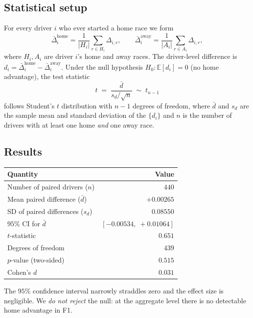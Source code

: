 \documentclass[11pt,a4paper]{article}
\newcommand{\E}{\mathbb{E}}
\begin{document}
\subsection{Statistical setup}
For every driver $i$ who ever started a home race we form
\begin{equation}
\bar{\Delta}_i^{\text{home}} = \frac{1}{|H_i|}\sum_{r\in H_i}\Delta_{i,r},
\qquad
\bar{\Delta}_i^{\text{away}} = \frac{1}{|A_i|}\sum_{r\in A_i}\Delta_{i,r},
\end{equation}
where $H_i,A_i$ are driver $i$'s home and away races. The driver-level
difference is $d_i = \bar{\Delta}_i^{\text{home}} - \bar{\Delta}_i^{\text{away}}$.
Under the null hypothesis $H_0:\E[d_i]=0$ (no home advantage), the test
statistic
\begin{equation}
    t \;=\; \frac{\bar{d}}{s_d/\sqrt{n}} \;\sim\; t_{n-1}
\end{equation}
follows Student's $t$ distribution with $n-1$ degrees of freedom, where
$\bar{d}$ and $s_d$ are the sample mean and standard deviation of the
$\{d_i\}$ and $n$ is the number of drivers with at least one home
\emph{and} one away race.

\subsection{Results}
\begin{center}
\begin{tabular}{lr}
\toprule
Quantity & Value \\
\midrule
Number of paired drivers ($n$)             & $440$ \\
Mean paired difference ($\bar{d}$)         & $+0.00265$ \\
SD of paired differences ($s_d$)           & $0.08550$ \\
$95\%$ CI for $\bar{d}$                    & $[-0.00534,\; +0.01064]$ \\
$t$-statistic                              & $0.651$ \\
Degrees of freedom                         & $439$ \\
$p$-value (two-sided)                      & $0.515$ \\
Cohen's $d$                                & $0.031$ \\
\bottomrule
\end{tabular}
\end{center}

The $95\%$ confidence interval narrowly straddles zero and the effect size
is negligible. We \emph{do not reject} the null: at the aggregate level there
is no detectable home advantage in F1.
\end{document}
